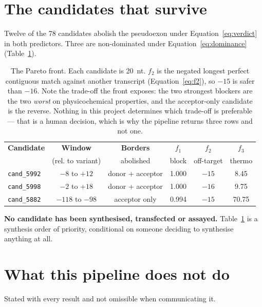 \documentclass[11pt,a4paper]{article}
\begin{document}
\section{The candidates that survive}
\label{sec:candidates}

Twelve of the 78 candidates abolish the pseudoexon under Equation~\ref{eq:verdict} in both
predictors. Three are non-dominated under Equation~\ref{eq:dominance} (Table~\ref{tab:front}).

\begin{table}[htbp]
\centering
\small
\begin{tabular}{@{}lccccc@{}}
\toprule
\textbf{Candidate} & \textbf{Window} & \textbf{Borders} & $f_1$ & $f_2$ & $f_3$ \\
 & (rel. to variant) & abolished & block & off-target & thermo \\
\midrule
\texttt{cand\_5992} & $-8$ to $+12$    & donor + acceptor & 1.000 & $-15$ & \phantom{0}8.45 \\
\texttt{cand\_5998} & $-2$ to $+18$    & donor + acceptor & 1.000 & $-16$ & \phantom{0}9.75 \\
\texttt{cand\_5882} & $-118$ to $-98$  & acceptor only    & 0.994 & $-15$ & 70.75 \\
\bottomrule
\end{tabular}
\caption{The Pareto front. Each candidate is 20~nt. $f_2$ is the negated longest perfect contiguous
match against another transcript (Equation~\ref{eq:f2}), so $-15$ is safer than $-16$. Note the
trade-off the front exposes: the two strongest blockers are the two \emph{worst} on
physicochemical properties, and the acceptor-only candidate is the reverse. Nothing in this project
determines which trade-off is preferable --- that is a human decision, which is why the pipeline
returns three rows and not one.}
\label{tab:front}
\end{table}

\textbf{No candidate has been synthesised, transfected or assayed.} Table~\ref{tab:front} is a
synthesis order of priority, conditional on someone deciding to synthesise anything at all.

\section{What this pipeline does not do}

Stated with every result and not omissible when communicating it.
\end{document}
